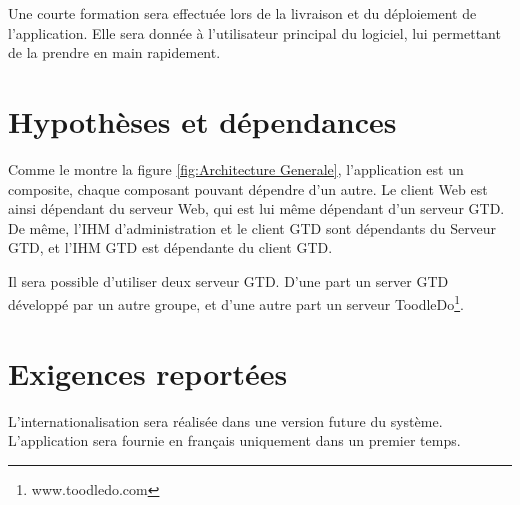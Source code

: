 \medskip

Une courte formation sera effectuée lors de la livraison et du déploiement de l'application. Elle sera donnée à l'utilisateur principal du logiciel, lui permettant de la prendre en main rapidement.

	\section{Hypothèses et dépendances}
	

Comme le montre la figure \ref{fig:Architecture Generale}, l'application est un composite, chaque composant pouvant dépendre d'un autre. Le client Web est ainsi dépendant du serveur Web, qui est lui même dépendant d'un serveur GTD. De même, l'IHM d'administration et le client GTD sont dépendants du Serveur GTD, et l'IHM GTD est dépendante du client GTD.

\medskip

Il sera possible d'utiliser deux serveur GTD. D'une part un server GTD développé par un autre groupe, et d'une autre part un serveur ToodleDo\footnote{www.toodledo.com}.
\section{Exigences reportées}
L'internationalisation sera réalisée dans une version future du système. L'application sera fournie en français uniquement dans un premier temps.
